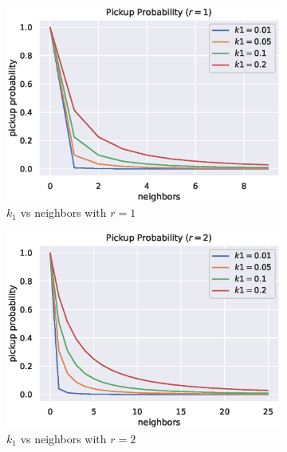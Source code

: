 \documentclass[12pt]{article}
\begin{document}
\begin{figure}[H]
    \begin{subfigure}[t]{0.32\textwidth}
        \centering
        \includegraphics[width=\textwidth]{figures/aca/k1-r1.eps}
        \caption{$k_1$ vs neighbors with $r=1$}
    \end{subfigure}%
    \begin{subfigure}[t]{0.32\textwidth}
        \centering
        \includegraphics[width=\textwidth]{figures/aca/k1-r2.eps}
        \caption{$k_1$ vs neighbors with $r=2$}
    \end{subfigure}%
    \begin{subfigure}[t]{0.32\textwidth}
        \centering

\end{subfigure}
\end{figure}
\end{document}
